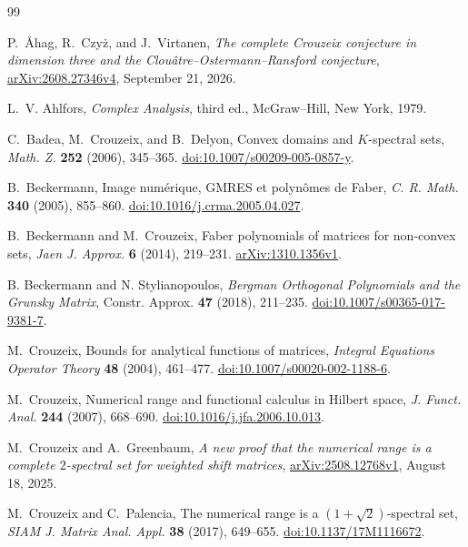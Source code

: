 \begin{thebibliography}{99}
\raggedright

P.~\AA hag, R.~Czy{\.{z}}, and J.~Virtanen,
\emph{The complete Crouzeix conjecture in dimension three and the
Clou\^atre--Ostermann--Ransford conjecture},
\href{https://arxiv.org/abs/2608.27346v4}{arXiv:2608.27346v4}, September 21, 2026.

L.~V. Ahlfors, \emph{Complex Analysis}, third ed., McGraw--Hill, New York, 1979.

C.~Badea, M.~Crouzeix, and B.~Delyon,
Convex domains and $K$-spectral sets,
\emph{Math. Z.} \textbf{252} (2006), 345--365.
\href{https://doi.org/10.1007/s00209-005-0857-y}{doi:10.1007/s00209-005-0857-y}.

B.~Beckermann, Image num{\'e}rique, GMRES et polyn{\^o}mes de Faber,
\emph{C. R. Math.} \textbf{340} (2005), 855--860.
\href{https://doi.org/10.1016/j.crma.2005.04.027}{doi:10.1016/j.crma.2005.04.027}.

B.~Beckermann and M.~Crouzeix,
Faber polynomials of matrices for non-convex sets,
\emph{Jaen J. Approx.} \textbf{6} (2014), 219--231.
\href{https://arxiv.org/abs/1310.1356v1}{arXiv:1310.1356v1}.

B. Beckermann and N. Stylianopoulos,
\emph{Bergman Orthogonal Polynomials and the Grunsky Matrix},
Constr. Approx. \textbf{47} (2018), 211--235.
\href{https://doi.org/10.1007/s00365-017-9381-7}{doi:10.1007/s00365-017-9381-7}.

M.~Crouzeix, Bounds for analytical functions of matrices,
\emph{Integral Equations Operator Theory} \textbf{48} (2004), 461--477.
\href{https://doi.org/10.1007/s00020-002-1188-6}{doi:10.1007/s00020-002-1188-6}.

M.~Crouzeix, Numerical range and functional calculus in Hilbert space,
\emph{J. Funct. Anal.} \textbf{244} (2007), 668--690.
\href{https://doi.org/10.1016/j.jfa.2006.10.013}{doi:10.1016/j.jfa.2006.10.013}.

M.~Crouzeix and A.~Greenbaum,
\emph{A new proof that the numerical range is a complete $2$-spectral
set for weighted shift matrices},
\href{https://arxiv.org/abs/2508.12768v1}{arXiv:2508.12768v1},
August 18, 2025.

M.~Crouzeix and C.~Palencia,
The numerical range is a $(1+\sqrt{2})$-spectral set,
\emph{SIAM J. Matrix Anal. Appl.} \textbf{38} (2017), 649--655.
\href{https://doi.org/10.1137/17M1116672}{doi:10.1137/17M1116672}.


\end{thebibliography}
